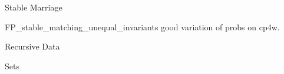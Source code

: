 \documentclass[quiz]{mcs}
\begin{document}
\begin{staffnotes}
\begin{center}
{\large Stable Marriage}
\end{center}
\end{staffnotes}




\examspace

\begin{staffnotes}
FP\_stable\_matching\_unequal\_invariants good variation of probs on cp4w.
\end{staffnotes}

\begin{staffnotes}
\begin{center}
{\large Recursive Data}
\end{center}
\end{staffnotes}





\examspace


\begin{staffnotes}
\begin{center}
{\large Sets}
\end{center}
\end{staffnotes}


\examspace

%
%
%
%
\end{document}

